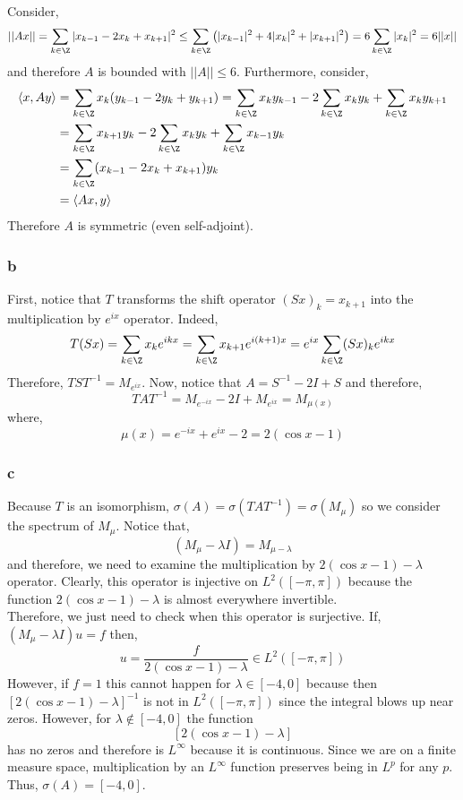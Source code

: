 \documentclass[12pt]{article}
\newcommand{\inner}[2]{\left< #1, #2 \right>}
\begin{document}
Consider,
\[ || A x || = \sum_{k \in \Z} |x_{k - 1} - 2 x_k + x_{k + 1}|^2 \le \sum_{k \in \Z} \left( | x_{k - 1} |^2 + 4 | x_k |^2 + | x_{k + 1}|^2 \right) = 6 \sum_{k \in \Z} | x_k |^2 = 6 || x || \]
and therefore $A$ is bounded with $|| A || \le 6$. Furthermore, consider,
\begin{align*}
\inner{x}{A y} & = \sum_{k \in \Z} x_k (y_{k - 1} - 2 y_k + y_{k + 1}) = \sum_{k \in \Z} x_k y_{k - 1} - 2 \sum_{k \in \Z} x_k y_k + \sum_{k \in \Z} x_k y_{k + 1} 
\\
& = \sum_{k \in \Z} x_{k+1} y_k - 2 \sum_{k \in \Z} x_k y_k + \sum_{k \in \Z} x_{k - 1} y_k
\\
& = \sum_{k \in \Z} (x_{k - 1} - 2 x_{k} + x_{k+1}) y_k 
\\
& = \inner{A x}{y}
\end{align*}
Therefore $A$ is symmetric (even self-adjoint).

\subsubsection{b}

First, notice that $T$ transforms the shift operator $(S x)_k = x_{k+1}$ into the multiplication by $e^{i x}$ operator. Indeed,
\[ T (S x) = \sum_{k \in \Z} x_k e^{ikx} = \sum_{k \in \Z} x_{k+1} e^{i (k+1) x} = e^{ix} \sum_{k \in \Z} (S x)_{k} e^{ik x} \]
Therefore, $T S T^{-1} = M_{e^{ix}}$. Now, notice that $A = S^{-1} - 2 I + S$ and therefore,
\[ T A T^{-1} = M_{e^{-i x}} - 2 I + M_{e^{i x}} = M_{\mu(x)} \]
where,
\[ \mu(x) = e^{-ix} + e^{i x} - 2 = 2(\cos{x} - 1) \]

\subsubsection{c}

Because $T$ is an isomorphism, $\sigma(A) = \sigma(T A T^{-1}) = \sigma(M_\mu)$ so we consider the spectrum of $M_\mu$. Notice that,
\[ (M_\mu - \lambda I) = M_{\mu - \lambda} \]
and therefore, we need to examine the multiplication by $2(\cos{x} - 1) - \lambda$ operator. Clearly, this operator is injective on $L^2([-\pi, \pi])$ because the function $2( \cos{x} - 1) - \lambda$ is almost everywhere invertible.
\bigskip\\
Therefore, we just need to check when this operator is surjective. If, $(M_\mu - \lambda I) u = f$ then,
\[ u = \frac{f}{2(\cos{x} - 1) - \lambda} \in L^2([-\pi, \pi]) \]
However, if $f = 1$ this cannot happen for $\lambda \in [-4,0]$ because then $[2( \cos{x} - 1) - \lambda]^{-1}$ is not in $L^2([-\pi, \pi])$ since the integral blows up near zeros. However, for $\lambda \notin [-4, 0]$ the function \[ [2 (\cos{x} - 1) - \lambda] \]
 has no zeros and therefore is $L^\infty$ because it is continuous. Since we are on a finite measure space, multiplication by an $L^\infty$ function preserves being in $L^p$ for any $p$. Thus, $\sigma(A) = [-4, 0]$.
\end{document}
